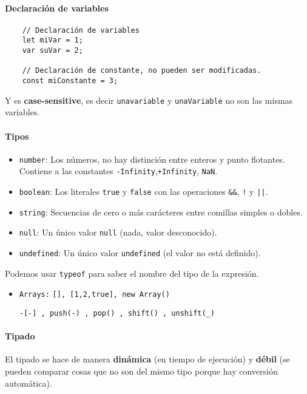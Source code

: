 \paragraph{Declaración de variables}
\begin{centrado}
	\begin{verbatim}
	// Declaración de variables
	let miVar = 1;
	var suVar = 2;
	
	// Declaración de constante, no pueden ser modificadas.
	const miConstante = 3; 
	\end{verbatim}
\end{centrado}

Y es \textbf{case-sensitive}, es decir \texttt{unavariable} y \texttt{unaVariable} no son las mismas variables.

\paragraph{Tipos}

\begin{itemize}
	\item \texttt{number}: Los números, no hay distinción entre enteros y punto flotantes. Contiene a las constantes \texttt{-Infinity},\texttt{+Infinity}, \texttt{NaN}.
	\item \texttt{boolean}: Los literales \texttt{true} y \texttt{false} con las operaciones \texttt{\&\&}, \texttt{!} y \texttt{||}.
	\item \texttt{string}: Secuencias de cero o más carácteres entre comillas simples o dobles.
	\item \texttt{null}: Un único valor \texttt{null} (nada, valor desconocido).
	\item \texttt{undefined}: Un único valor \texttt{undefined} (el valor no está definido).
\end{itemize}

Podemos usar \texttt{typeof} para saber el nombre del tipo de la expresión.

\begin{itemize}
\item \texttt{Arrays:} \texttt{[], [1,2,true], new Array()}

\texttt{-[-] , push(-) , pop() , shift() , unshift(_)}
\end{itemize}

\paragraph{Tipado}
El tipado se hace de manera \textbf{dinámica} (en tiempo de ejecución) y \textbf{débil} (se pueden comparar cosas que no son del mismo tipo porque hay conversión automática).

